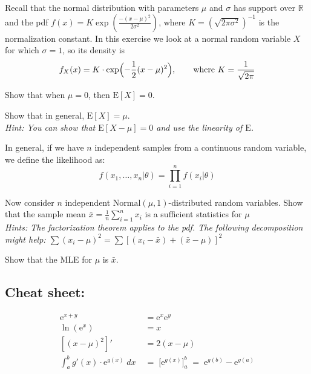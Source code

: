 \documentclass[10pt, a5paper]{scrartcl}
\begin{document}
\boardquestions

\begin{exercise}
  Recall that the normal distribution with parameters $\mu$ and $\sigma$ has support over $\mathbb{R}$ and the pdf $f(x) = K \exp(\frac{-(x-\mu)^2}{2\sigma^2})$, where $K = (\sqrt{2\pi\sigma^2})^{-1}$ is the normalization constant.
  In this exercise we look at a normal random variable $X$ for which $\sigma = 1$, so its density is
  \[
    f_X(x) = K \cdot \exp\Bigl(-\frac{1}{2}(x-\mu)^2\Bigr), 
      \qquad \text{where } K=\frac{1}{\sqrt{2\pi}}
  \]
 
 \begin{subex}
 	Show that when $\mu=0$, then $\mathrm{E}[X] = 0$.
 \end{subex}
 \begin{subex}
 	Show that in general, $\mathrm{E}[X] = \mu$.\\ \textit{Hint: You can show that $\mathrm{E}[X-\mu]=0$ and use the linearity of $\mathrm{E}$.}
 \end{subex}
 
 In general, if we have $n$ independent samples from a continuous random variable, we define the likelihood as:
 \[
  f(x_1,\dots, x_n|\theta) = \prod_{i=1}^n f(x_i|\theta)
 \]
 
 \begin{subex}
 Now consider $n$ independent $\text{Normal}(\mu, 1)$-distributed random variables.
 Show that the sample mean $\bar{x} = \frac{1}{n}\sum_{i=1}^n x_i$ is a sufficient statistics for $\mu$\\\textit{Hints: The factorization theorem applies to the pdf. The following decomposition might  help: $\sum(x_i - \mu)^2 = \sum \left[(x_i - \bar{x}) + (\bar{x}-\mu) \right]^2 $}
 \end{subex}
 \begin{subex}
 Show that the MLE for $\mu$ is  $\bar{x}$.
 \end{subex}

\subsection*{Cheat sheet:}
\begin{align*}
  \mathrm{e}^{x+y} 
    &= \mathrm{e}^{x}\mathrm{e}^{y} 
  \\
  \ln(\mathrm{e}^{x}) 
    &= x
  \\
  [(x-\mu)^2]' 
    &= 2(x-\mu)
  \\
   \int_a^b g'(x) \cdot \mathrm{e}^{g(x)} \; dx 
    \; &= \; \bigl[\mathrm{e}^{g(x)}\bigr]_a^b 
    \; = \; \mathrm{e}^{g(b)} - \mathrm{e}^{g(a)}
\end{align*}  
\end{exercise}

\end{document}
